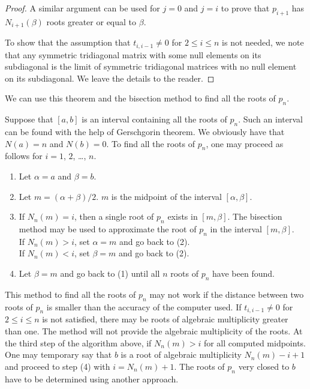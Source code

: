 \begin{proof}
A similar argument can be used for $j=0$ and $j=i$ to prove that
$p_{i+1}$ has $N_{i+1}(\beta)$ roots greater or equal to $\beta$.

To show that the assumption that
$t_{i,i-1} \neq 0$ for $2\leq i \leq n$ is not needed, we note that
any symmetric tridiagonal matrix with some null elements on its
subdiagonal is the limit of symmetric  tridiagonal matrices with no
null element on its subdiagonal.  We leave the details to the reader.
\end{proof}

We can use this theorem and the bisection method to find all the roots of
$p_n$.

\begin{algo}{\alg}
Suppose that $[a,b]$ is an interval containing all the roots of
$p_n$.  Such an interval can be found with the help of Gerschgorin theorem.
We obviously have that $N(a)=n$ and $N(b) = 0$.
To find all the roots of $p_n$, one may proceed as follows for $i=1$, $2$,
\ldots, $n$.
\begin{enumerate}
\item Let $\alpha =a$ and $\beta = b$.
\item Let $m = (\alpha+\beta)/2$.  $m$ is the midpoint of the interval
$[\alpha,\beta]$. 
\item If $N_n(m) = i$, then a single root of $p_n$ exists in
$[m,\beta]$.  The bisection method may be used to approximate the
root of $p_n$ in the interval $[m,\beta]$.\\
If $N_n(m)>i$, set $\alpha = m$ and go back to (2).\\
If $N_n(m)<i$, set $\beta = m$ and go back to (2).
\item Let $\beta=m$ and go back to (1) until all $n$ roots of
$p_n$ have been found.
\end{enumerate}
\end{algo}

This method to find all the roots of $p_n$ may not work if the distance
between two roots of $p_n$ is smaller than the accuracy of the computer used.
If $t_{i,i-1} \neq 0$ for $2\leq i \leq n$ is not satisfied, there may be
roots of algebraic multiplicity greater than one.  The method will not
provide the algebraic multiplicity of the roots.  At the third step
of the algorithm above, if $N_n(m)>i$ for all computed midpoints.  One may
temporary say that $b$ is a root of algebraic multiplicity
$N_n(m) - i + 1$ and proceed to step (4) with $i= N_n(m)+1$.  The roots of
$p_n$ very closed to $b$ have to be determined using another approach.


